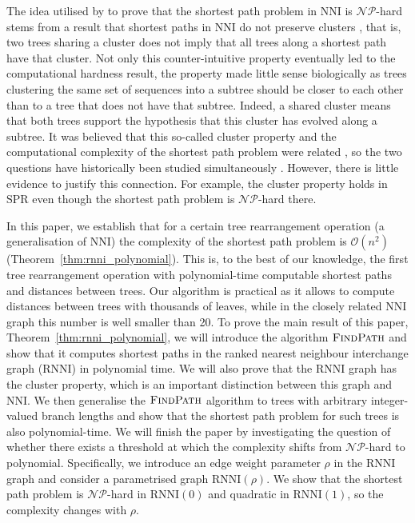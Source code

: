 \documentclass[11pt]{amsart}
\newcommand{\rnni}{\mathrm{RNNI}}
\newcommand{\findpath}{\textsc{FindPath}}
\newcommand{\nni}{\mathrm{NNI}}
\newcommand{\spr}{\mathrm{SPR}}
\newcommand{\np}{\mathcal{NP}}
\renewcommand{\O}{\mathcal O}
\newcommand{\summary}[1]{} %
\begin{document}
\summary{Historically, the complexity question was following hand in hand with the cluster property -- more history plus biological relevance of the property.}
The idea utilised by \textcite{Dasgupta2000-xa} to prove that the shortest path problem in $\nni$ is $\np$-hard stems from a result that shortest paths in $\nni$ do not preserve clusters \autocite{Li1996-zw}, that is, two trees sharing a cluster does not imply that all trees along a shortest path have that cluster.
Not only this counter-intuitive property eventually led to the computational hardness result, the property made little sense biologically as trees clustering the same set of sequences into a subtree should be closer to each other than to a tree that does not have that subtree.
Indeed, a shared cluster means that both trees support the hypothesis that this cluster has evolved along a subtree.
It was believed that this so-called cluster property and the computational complexity of the shortest path problem were related \autocite{Li1996-zw}, so the two questions have historically been studied simultaneously \autocite{Dasgupta2000-xa}.
However, there is little evidence to justify this connection.
For example, the cluster property holds in $\spr$ even though the shortest path problem is $\np$-hard there.

\summary{Paper summary in light of motivation: We've discovered the first efficiently computable distance, given by a parameter range in known tree spaces, and want to understand the reason for the complexity jump -- cite ``Beyond worst-case complexity.''}
In this paper, we establish that for a certain tree rearrangement operation (a generalisation of $\nni$) the complexity of the shortest path problem is $\O(n^2)$ (Theorem~\ref{thm:rnni_polynomial}).
This is, to the best of our knowledge, the first tree rearrangement operation with polynomial-time computable shortest paths and distances between trees.
Our algorithm is practical as it allows to compute distances between trees with thousands of leaves, while in the closely related $\nni$ graph this number is well smaller \autocite{Li1996-zw, Whidden2016-kl} than 20.
To prove the main result of this paper, Theorem~\ref{thm:rnni_polynomial}, we will introduce the algorithm $\findpath$ and show that it computes shortest paths in the ranked nearest neighbour interchange graph ($\rnni$) in polynomial time.
We will also prove that the $\rnni$ graph has the cluster property, which is an important distinction between this graph and $\nni$.
We then generalise the $\findpath$ algorithm to trees with arbitrary integer-valued branch lengths and show that the shortest path problem for such trees is also polynomial-time.
We will finish the paper by investigating the question of whether there exists a threshold at which the complexity shifts from $\np$-hard to polynomial.
Specifically, we introduce an edge weight parameter $\rho$ in the $\rnni$ graph and consider a parametrised graph $\rnni(\rho)$.
We show that the shortest path problem is $\np$-hard in $\rnni(0)$ and quadratic in $\rnni(1)$, so the complexity changes with $\rho$.
\end{document}
